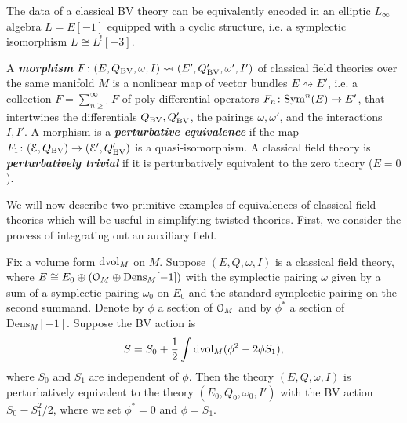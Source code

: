 \documentclass[10pt, oneside]{article}
\newcommand{\Dens}{\mathrm{Dens}}
\newcommand{\defterm}[1]{\textbf{\emph{#1}}}
\begin{document}
\begin{remark}
The data of a classical BV theory can be equivalently encoded in an elliptic $L_\infty$ algebra $L=E[-1]$ equipped with a cyclic structure, i.e. a symplectic isomorphism $L\cong L^![-3]$.
\end{remark}

\begin{definition}
A \defterm{morphism} $F\colon (E, Q_{\mathrm{BV}}, \omega, I) \rightsquigarrow (E', Q_{\mathrm{BV}}', \omega', I')$ of classical field theories over the same manifold $M$ is a nonlinear map of vector bundles $E\rightsquigarrow E'$, i.e. a collection $F=\sum_{n\geq 1}^\infty F$ of poly-differential operators $F_n\colon {\rm Sym}^n(E)\rightarrow E'$, that intertwines the differentials $Q_{\mathrm{BV}}, Q_{\mathrm{BV}}'$, the pairings $\omega, \omega'$, and the interactions $I,I'$. A morphism is a \defterm{perturbative equivalence} if the map $F_1\colon (\mathcal E, Q_{\mathrm{BV}})\rightarrow (\mathcal E', Q_{\mathrm{BV}}')$ is a quasi-isomorphism. A classical field theory is \defterm{perturbatively trivial} if it is perturbatively equivalent to the zero theory ($E = 0$).
\end{definition}

We will now describe two primitive examples of equivalences of classical field theories which will be useful in simplifying twisted theories. First, we consider the process of integrating out an auxiliary field.

 

\begin{prop}
Fix a volume form $\operatorname{dvol}_M$ on $M$. Suppose $(E, Q, \omega, I)$ is a classical field theory, where $E\cong E_0\oplus (\cO_M\oplus \Dens_M[-1])$ with the symplectic pairing $\omega$ given by a sum of a symplectic pairing $\omega_0$ on $E_0$ and the standard symplectic pairing on the second summand. Denote by $\phi$ a section of $\mathcal O_M$ and by $\phi^*$ a section of $\Dens_M[-1]$. Suppose the BV action is
\[S = S_0 + \frac{1}{2} \int \operatorname{dvol}_M (\phi^2 - 2\phi S_1),\]
where $S_0$ and $S_1$ are independent of $\phi$. Then the theory $(E, Q, \omega, I)$ is perturbatively equivalent to the theory $(E_0, Q_0, \omega_0, I')$ with the BV action $S_0 - S_1^2/2$, where we set $\phi^* = 0$ and $\phi = S_1$.
\label{prop:integrateoutfield}
\end{prop}
\end{document}
